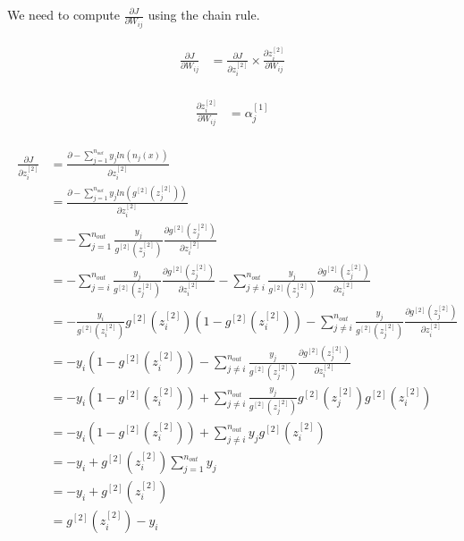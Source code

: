 \documentclass[paper=a4, fontsize=11pt]{scrartcl} %
\numberwithin{equation}{section} %
\numberwithin{figure}{section} %
\numberwithin{table}{section} %
\begin{document}
We need to compute $\frac{\partial J}{\partial W_{ij}}$ using the chain rule.

\begin{align} 
\begin{split}
\frac{\partial J}{\partial W_{ij}} 	&= \frac{\partial J}{\partial z^{[2]}_i } \times \frac{\partial  z^{[2]}_i }{\partial  W_{ij} } 
\end{split}					
\end{align}

\begin{align} 
\begin{split}
\frac{\partial  z^{[2]}_i }{\partial  W_{ij} }  	&= \alpha^{[1]}_j
\end{split}					
\end{align}

\begin{align} 
\begin{split}
\frac{\partial J}{\partial z^{[2]}_i }  	&= \frac{\partial -\sum_{j=1}^{n_{out}}y_j ln (n_j(x))}{\partial z^{[2]}_i }\\
&= \frac{\partial -\sum_{j=1}^{n_{out}}y_j ln (g^{[2]}(z^{[2]}_j))}{\partial z^{[2]}_i }\\
&= -\sum_{j=1}^{n_{out}}\frac{y_j}{g^{[2]}(z^{[2]}_j)} \frac{\partial g^{[2]}(z^{[2]}_j)}{\partial z^{[2]}_i } \\
&= -\sum_{j=i}^{n_{out}}\frac{y_j}{g^{[2]}(z^{[2]}_j)} \frac{\partial g^{[2]}(z^{[2]}_j)}{\partial z^{[2]}_i } -\sum_{j \ne i}^{n_{out}}\frac{y_j}{g^{[2]}(z^{[2]}_j)} \frac{\partial g^{[2]}(z^{[2]}_j)}{\partial z^{[2]}_i }  \\
&= -\frac{y_i}{g^{[2]}(z^{[2]}_i)}g^{[2]}(z^{[2]}_i)(1 - g^{[2]}(z^{[2]}_i)) -\sum_{j \ne i}^{n_{out}}\frac{y_j}{g^{[2]}(z^{[2]}_j)} \frac{\partial g^{[2]}(z^{[2]}_j)}{\partial z^{[2]}_i }  \\
&= -y_i(1 - g^{[2]}(z^{[2]}_i)) -\sum_{j \ne i}^{n_{out}}\frac{y_j}{g^{[2]}(z^{[2]}_j)} \frac{\partial g^{[2]}(z^{[2]}_j)}{\partial z^{[2]}_i }  \\
&= -y_i(1 - g^{[2]}(z^{[2]}_i)) +\sum_{j \ne i}^{n_{out}}\frac{y_j}{g^{[2]}(z^{[2]}_j)} g^{[2]}(z^{[2]}_j) g^{[2]}(z^{[2]}_i)  \\
&= -y_i(1 - g^{[2]}(z^{[2]}_i)) +\sum_{j \ne i}^{n_{out}}y_j g^{[2]}(z^{[2]}_i)  \\
&= -y_i + g^{[2]}(z^{[2]}_i) \sum_{j=1}^{n_{out}}y_j  \\
&= -y_i + g^{[2]}(z^{[2]}_i)  \\
&= g^{[2]}(z^{[2]}_i) - y_i  \\
\end{split}
\end{align}
\end{document}
